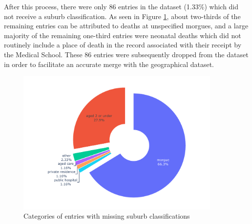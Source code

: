 After this process, there were only 86 entries in the dataset (1.33\%) which did not receive a suburb classification. As seen in Figure \ref{fig:missing-suburbs}, about two-thirds of the remaining entries can be attributed to deaths at unspecified morgues, and a large majority of the remaining one-third entries were neonatal deaths which did not routinely include a place of death in the record associated with their receipt by the Medical School. These 86 entries were subsequently dropped from the dataset in order to facilitate an accurate merge with the geographical dataset.

\begin{figure}
    \centering
    \caption{Categories of entries with missing suburb classifications}
    \label{fig:missing-suburbs}
    \includegraphics[width=0.9\textwidth]{REPORT/img/missing_suburbs.pdf}
\end{figure}

